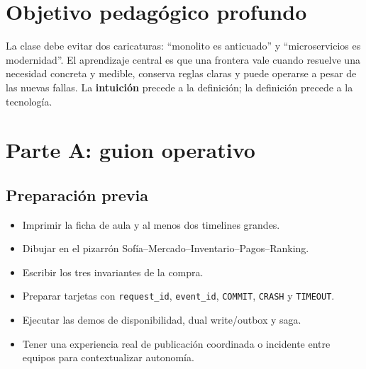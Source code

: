 \documentclass[variant=docente,cover=institutional,mode=screen]{ua-engineering-v6-article}
\begin{document}
\section{Objetivo pedagógico profundo}
La clase debe evitar dos caricaturas: ``monolito es anticuado'' y ``microservicios es modernidad''. El aprendizaje central es que una frontera vale cuando resuelve una necesidad concreta y medible, conserva reglas claras y puede operarse a pesar de las nuevas fallas. La \textbf{intuición} precede a la definición; la definición precede a la tecnología.

\section{Parte A: guion operativo}

\subsection{Preparación previa}
\begin{itemize}
\item Imprimir la ficha de aula y al menos dos timelines grandes.
\item Dibujar en el pizarrón Sofía--Mercado--Inventario--Pagos--Ranking.
\item Escribir los tres invariantes de la compra.
\item Preparar tarjetas con \texttt{request\_id}, \texttt{event\_id}, \texttt{COMMIT}, \texttt{CRASH} y \texttt{TIMEOUT}.
\item Ejecutar las demos de disponibilidad, dual write/outbox y saga.
\item Tener una experiencia real de publicación coordinada o incidente entre equipos para contextualizar autonomía.
\end{itemize}
\end{document}
